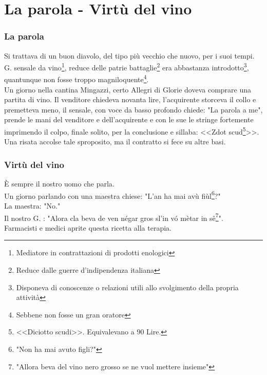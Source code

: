 
\chapter{La parola - Virtù del vino}
\subsection{La parola}
Si trattava di un buon diavolo, del tipo più vecchio che nuovo, per i suoi tempi. G. \: \: sensale da vino\footnote{Mediatore in contrattazioni di prodotti enologici}, reduce delle patrie battaglie\footnote{Reduce dalle guerre d'indipendenza italiana} era abbastanza introdotto\footnote{Disponeva di conoscenze o relazioni utili allo svolgimento della propria attività}, quantunque non fosse troppo magniloquente\footnote{Sebbene non fosse un gran oratore}.\\
\indent Un giorno nella cantina Mingazzi, certo Allegri di Glorie doveva comprare una partita di vino. Il venditore chiedeva novanta lire, l'acquirente storceva il collo e premetteva meno, il sensale, con voce da basso profondo chiede: "La parola a me", prende le mani del venditore e dell'acquirente e con le sue le stringe fortemente imprimendo il colpo, finale solito, per la conclusione e sillaba: <<Zdot scud\footnote{<<Diciotto scudi>>. Equivalevano a 90 Lire.}>>.\\
Una risata accolse tale sproposito, ma il contratto si fece su altre basi.
\subsection{Virtù del vino}
È sempre il nostro uomo che parla.\\
Un giorno parlando con una maestra chiese: "L'an ha mai avù fiùl\footnote{"Non ha mai avuto figli?"}?"\\
La maestra: "No."\\
Il nostro G. \:\:\:\:: "Alora cla beva de ven négar gros sl'in vó mètar in sê\footnote{"Allora beva del vino nero grosso se ne vuol mettere insieme"}".\\
Farmacisti e medici aprite questa ricetta alla terapia. 
